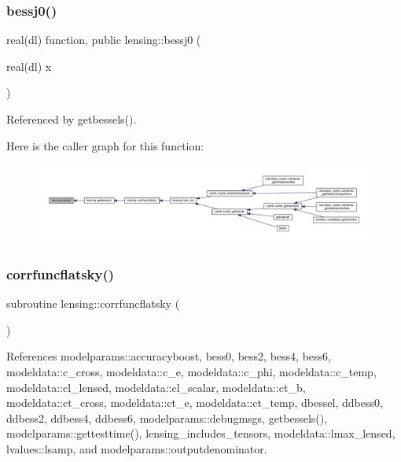 \subsubsection{\texorpdfstring{bessj0()}{bessj0()}}
{\footnotesize\ttfamily real(dl) function, public lensing\+::bessj0 (\begin{DoxyParamCaption}\item[{real(dl)}]{x }\end{DoxyParamCaption})}



Referenced by getbessels().

Here is the caller graph for this function\+:
\nopagebreak
\begin{figure}[H]
\begin{center}
\leavevmode
\includegraphics[width=350pt]{namespacelensing_a8fca1155759235e997ecc5ebcb8273bc_icgraph}
\end{center}
\end{figure}
\mbox{\label{namespacelensing_aa3cc70dd58b493d3192e97f675ffa909}} 
\subsubsection{\texorpdfstring{corrfuncflatsky()}{corrfuncflatsky()}}
{\footnotesize\ttfamily subroutine lensing\+::corrfuncflatsky (\begin{DoxyParamCaption}{ }\end{DoxyParamCaption})}



References modelparams\+::accuracyboost, bess0, bess2, bess4, bess6, modeldata\+::c\+\_\+cross, modeldata\+::c\+\_\+e, modeldata\+::c\+\_\+phi, modeldata\+::c\+\_\+temp, modeldata\+::cl\+\_\+lensed, modeldata\+::cl\+\_\+scalar, modeldata\+::ct\+\_\+b, modeldata\+::ct\+\_\+cross, modeldata\+::ct\+\_\+e, modeldata\+::ct\+\_\+temp, dbessel, ddbess0, ddbess2, ddbess4, ddbess6, modelparams\+::debugmsgs, getbessels(), modelparams\+::gettesttime(), lensing\+\_\+includes\+\_\+tensors, modeldata\+::lmax\+\_\+lensed, lvalues\+::lsamp, and modelparams\+::outputdenominator.



